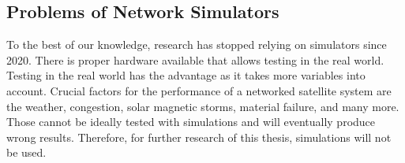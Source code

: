 \subsection{Problems of Network Simulators}

To the best of our knowledge, research has stopped relying on simulators since
2020. There is proper hardware available that allows testing in the real world.
Testing in the real world has the advantage as it takes more variables into
account. Crucial factors for the performance of a networked satellite system
are the weather, congestion, solar magnetic storms, material failure, and many
more. Those cannot be ideally tested with simulations and will eventually
produce wrong results. Therefore, for further research of this thesis,
simulations will not be used.
